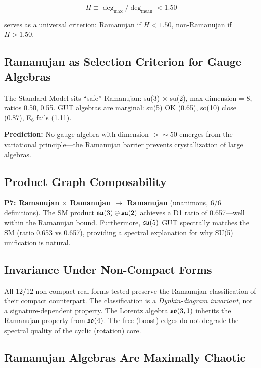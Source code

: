 \begin{equation}
H \equiv \deg_{\max} / \deg_{\mathrm{mean}} < 1.50
\end{equation}

serves as a universal criterion: Ramanujan if $H < 1.50$, non-Ramanujan if $H > 1.50$.

\subsection{Ramanujan as Selection Criterion for Gauge Algebras}\label{sec:gauge_selection}

The Standard Model sits ``safe'' Ramanujan: su(3) $\times$ su(2), max dimension = 8, ratios 0.50, 0.55. GUT algebras are marginal: su(5) OK (0.65), so(10) close (0.87), E$_6$ fails (1.11).

\textbf{Prediction:} No gauge algebra with dimension $> \sim\!50$ emerges from the variational principle---the Ramanujan barrier prevents crystallization of large algebras.

\subsection{Product Graph Composability}\label{sec:composability}

\textbf{P7: Ramanujan $\times$ Ramanujan $\to$ Ramanujan} (unanimous, 6/6 definitions). The SM product $\mathfrak{su}(3) \oplus \mathfrak{su}(2)$ achieves a D1 ratio of 0.657---well within the Ramanujan bound. Furthermore, $\mathfrak{su}(5)$ GUT spectrally matches the SM (ratio 0.653 vs 0.657), providing a spectral explanation for why SU(5) unification is natural.

\subsection{Invariance Under Non-Compact Forms}\label{sec:noncompact_invariance}

All $12/12$ non-compact real forms tested preserve the Ramanujan classification of their compact counterpart. The classification is a \emph{Dynkin-diagram invariant}, not a signature-dependent property. The Lorentz algebra $\mathfrak{so}(3,1)$ inherits the Ramanujan property from $\mathfrak{so}(4)$. The free (boost) edges do not degrade the spectral quality of the cyclic (rotation) core.

\subsection{Ramanujan Algebras Are Maximally Chaotic}\label{sec:maximal_chaos}

